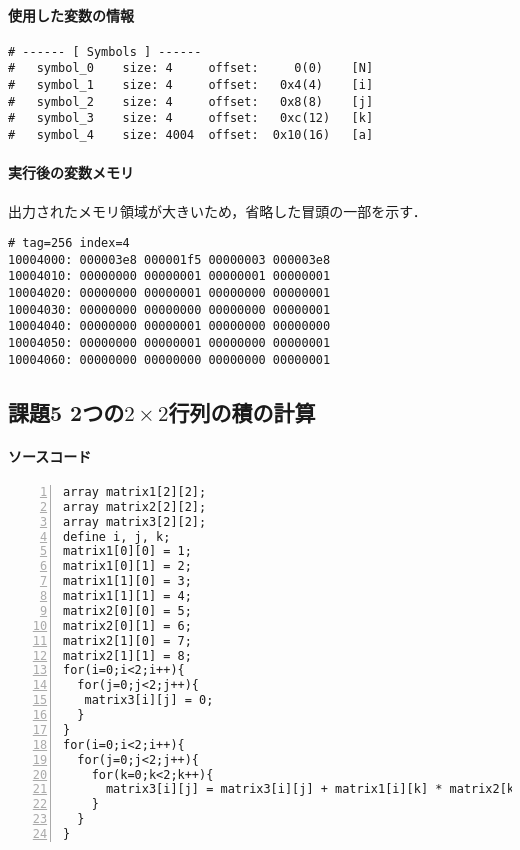 \paragraph*{使用した変数の情報}
\begin{Verbatim}[numbers=none, frame=single,
  fontsize=\small, baselinestretch=0.8]
# ------ [ Symbols ] ------
# 	symbol_0 	size: 4 	offset:     0(0) 	[N]
# 	symbol_1 	size: 4 	offset:   0x4(4) 	[i]
# 	symbol_2 	size: 4 	offset:   0x8(8) 	[j]
# 	symbol_3 	size: 4 	offset:   0xc(12) 	[k]
# 	symbol_4 	size: 4004 	offset:  0x10(16) 	[a]  
\end{Verbatim}

\paragraph*{実行後の変数メモリ}
出力されたメモリ領域が大きいため，省略した冒頭の一部を示す．

\begin{Verbatim}[numbers=none, frame=single,
  fontsize=\small, baselinestretch=0.8]
  # tag=256 index=4
10004000: 000003e8 000001f5 00000003 000003e8
10004010: 00000000 00000001 00000001 00000001
10004020: 00000000 00000001 00000000 00000001
10004030: 00000000 00000000 00000000 00000001
10004040: 00000000 00000001 00000000 00000000
10004050: 00000000 00000001 00000000 00000001
10004060: 00000000 00000000 00000000 00000001
\end{Verbatim}

\subsection{課題5 2つの$2 \times 2$行列の積の計算}
\paragraph*{ソースコード}

\begin{Verbatim}[numbers=left, xleftmargin=10mm, numbersep=6pt, frame=single,
  fontsize=\small, baselinestretch=0.8]
array matrix1[2][2];
array matrix2[2][2];
array matrix3[2][2];
define i, j, k;
matrix1[0][0] = 1;
matrix1[0][1] = 2;
matrix1[1][0] = 3;
matrix1[1][1] = 4;
matrix2[0][0] = 5;
matrix2[0][1] = 6;
matrix2[1][0] = 7;
matrix2[1][1] = 8;
for(i=0;i<2;i++){
  for(j=0;j<2;j++){
   matrix3[i][j] = 0;
  }
}
for(i=0;i<2;i++){
  for(j=0;j<2;j++){
    for(k=0;k<2;k++){
      matrix3[i][j] = matrix3[i][j] + matrix1[i][k] * matrix2[k][j];
    }
  }
}
\end{Verbatim}

